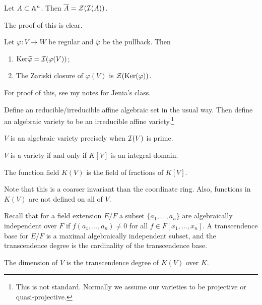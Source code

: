 \documentclass[10pt, twoside]{article}
\begin{document}
        \begin{prop}
            Let $A \subset \mathbb{A}^n$. Then $\overline{A} = \mathcal{Z}(\mathcal{I}(A))$.
        \end{prop}
        The proof of this is clear.

        \begin{prop}
            Let $\varphi:V \to W$ be regular and $\widetilde{\varphi}$ be the pullback. Then
            \begin{enumerate}
                \item $\mathrm{Ker} \widetilde{\varphi} = \mathcal{I}(\varphi(V))$;
                \item The Zariski closure of $\varphi(V)$ is $\mathcal{Z}(\mathrm{Ker}(\varphi))$.
            \end{enumerate}
        \end{prop}

        For proof of this, see my notes for Jenia's class.

        Define an reducible/irreducible affine algebraic set in the usual way. Then define an algebraic variety to be an irreducible affine variety.\footnote{This is not standard. Normally we assume our varieties to be projective or quasi-projective.}

        \begin{prop}
            $V$ is an algebraic variety precisely when $\mathcal{I}(V)$ is prime.
        \end{prop}

        \begin{cor}
            $V$ is a variety if and only if $K[V]$ is an integral domain.
        \end{cor}

        \begin{defn}
            The function field $K(V)$ is the field of fractions of $K[V]$.
        \end{defn}

        Note that this is a coarser invariant than the coordinate ring. Also, functions in $K(V)$ are not defined on all of $V$.

        Recall that for a field extension $E/F$ a subset $\{a_1, \ldots, a_n\}$ are algebraically independent over $F$ if $f(a_1, \ldots, a_n) \neq 0$ for all $f \in F[x_1, \ldots, x_n]$. A transcendence base for $E/F$ is a maximal algebraically independent subset, and the transcendence degree is the cardinality of the transcendence base.

        \begin{defn}
            The dimension of $V$ is the transcendence degree of $K(V)$ over $K$.
        \end{defn}
\end{document}
